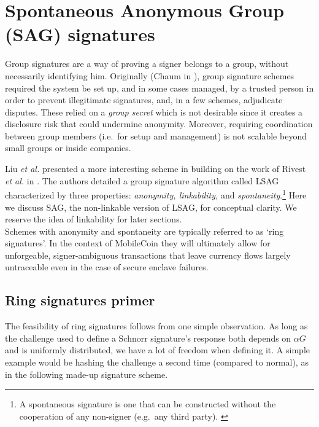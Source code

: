 \section{Spontaneous Anonymous Group (SAG) signatures}
\label{SAG_section}

Group signatures are a way of proving a signer belongs to a group, without necessarily identifying him. Originally (Chaum in \cite{Chaum:1991:GS:1754868.1754897}), group signature schemes required the system be set up, and in some cases managed, by a trusted person in order to prevent illegitimate signatures, and, in a few schemes, adjudicate disputes. These relied on a {\em group secret} which is not desirable since it creates a disclosure risk that could undermine anonymity. Moreover, requiring coordination between group members (i.e.\ for setup and management) is not scalable beyond small groups or inside companies.

Liu {\em et al.} presented a more interesting scheme in \cite{Liu2004} building on the work of Rivest {\em et al.} in \cite{rivest-leak-secret}. The authors detailed a group signature algorithm called LSAG characterized by three properties: {\em anonymity, linkability,} and {\em spontaneity}.\footnote{A spontaneous signature is one that can be constructed without the cooperation of any non-signer (e.g.\ any third party). \cite{Liu2004}} Here we discuss SAG, the non-linkable version of LSAG, for conceptual clarity. We reserve the idea of linkability for later sections.
\\

Schemes with anonymity and spontaneity are typically referred to as `ring signatures'. In the context of MobileCoin they will ultimately allow for unforgeable, signer-ambiguous transactions that leave currency flows largely untraceable even in the case of secure enclave failures.


\subsection*{Ring signatures primer}

The feasibility of ring signatures follows from one simple observation. As long as the challenge used to define a Schnorr signature's response both depends on $\alpha G$ and is uniformly distributed, we have a lot of freedom when defining it. A simple example would be hashing the challenge a second time (compared to normal), as in the following made-up signature scheme.

